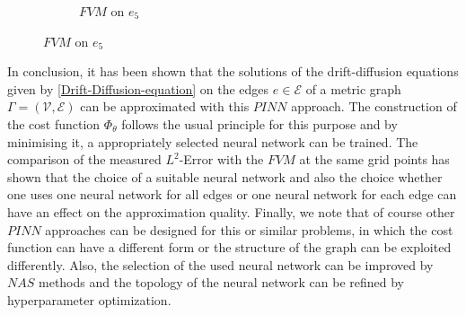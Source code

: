\begin{figure}[H]
\begin{center}
\begin{subfigure}[b]{0.4\textwidth}
\begin{center}
            \end{center}
            \caption{$FVM$ on $e_5$}
        \end{subfigure}
    \end{center}
\end{figure}

In conclusion, it has been shown that the solutions of the drift-diffusion equations given by \cref{Drift-Diffusion-equation} on the edges $e \in \mathcal{E}$ of a metric graph $\Gamma = \left(\mathcal{V}, \mathcal{E} \right)$ can be approximated with this $PINN$ approach. The construction of the cost function $\Phi_{\theta}$ follows the usual principle for this purpose and by minimising it, a appropriately selected neural network can be trained. The comparison of the measured $L^2$-Error with the $FVM$ at the same grid points has shown that the choice of a suitable neural network and also the choice whether one uses one neural network for all edges or one neural network for each edge can have an effect on the approximation quality. Finally, we note that of course other $PINN$ approaches can be designed for this or similar problems, in which the cost function can have a different form or the structure of the graph can be exploited differently. Also, the selection of the used neural network can be improved by $NAS$ methods and the topology of the neural network can be refined by hyperparameter optimization. \\

